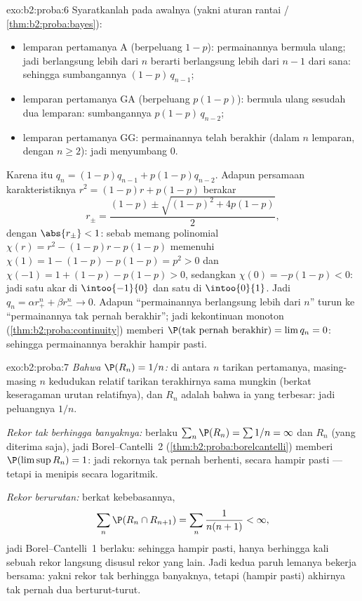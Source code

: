 \begin{solution}{exo:b2:proba:6}
Syaratkanlah pada awalnya (yakni aturan rantai /
\cref{thm:b2:proba:bayes}):
\begin{itemize}
\item lemparan pertamanya A (berpeluang $1 - p$): permainannya bermula
ulang; jadi berlangsung lebih dari $n$ berarti berlangsung lebih dari $n - 1$ dari
sana: sehingga sumbangannya $(1-p)\,q_{n-1}$;
\item lemparan pertamanya GA (berpeluang $p(1-p)$): bermula ulang sesudah dua
lemparan: sumbangannya $p(1-p)\,q_{n-2}$;
\item lemparan pertamanya GG: permainannya telah berakhir (dalam $n$ lemparan, dengan $n
\geq 2$): jadi menyumbang $0$.
\end{itemize}
Karena itu $q_n = (1-p)q_{n-1} + p(1-p)q_{n-2}$. Adapun persamaan
karakteristiknya $r^2 = (1-p)r + p(1-p)$ berakar
\[
r_\pm = \frac{(1-p) \pm \sqrt{(1-p)^2 + 4p(1-p)}}{2},
\]
dengan $\abs{r_\pm} < 1$: sebab memang polinomial $\chi(r) = r^2 -
(1-p)r - p(1-p)$ memenuhi $\chi(1) = 1 - (1-p) - p(1-p) = p^2 >
0$ dan $\chi(-1) = 1 + (1-p) - p(1-p) > 0$, sedangkan $\chi(0) =
-p(1-p) < 0$: jadi satu akar di $\intoo{-1}{0}$ dan satu di $\intoo{0}{1}$.
Jadi $q_n = \alpha r_+^n + \beta r_-^n \to 0$. Adapun  ``permainannya
berlangsung lebih dari $n$'' turun ke ``permainannya tak pernah berakhir''; jadi kekontinuan
monoton (\cref{thm:b2:proba:continuity}) memberi
$\P(\text{tak pernah berakhir}) = \lim q_n = 0$: sehingga permainannya berakhir hampir
pasti.
\end{solution}

\begin{solution}{exo:b2:proba:7}
\emph{Bahwa $\P(R_n) = 1/n$:} di antara $n$ tarikan pertamanya, masing-masing $n$
kedudukan relatif tarikan terakhirnya sama mungkin (berkat keseragaman
urutan relatifnya), dan $R_n$ adalah  bahwa ia yang
terbesar: jadi peluangnya $1/n$.

\emph{Rekor tak berhingga banyaknya:} berlaku $\sum_n \P(R_n) = \sum 1/n =
\infty$ dan $R_n$  (yang diterima saja), jadi
Borel--Cantelli~2 (\cref{thm:b2:proba:borelcantelli}) memberi
$\P(\limsup R_n) = 1$: jadi rekornya tak pernah berhenti, secara hampir pasti --- tetapi
ia menipis secara logaritmik.

\emph{Rekor berurutan:} berkat kebebasannya,
\[
\sum_n \P(R_n \cap R_{n+1})
= \sum_n \frac{1}{n(n+1)} < \infty ,
\]
jadi Borel--Cantelli~1 berlaku: sehingga hampir pasti, hanya berhingga kali
sebuah rekor langsung disusul rekor yang lain. Jadi kedua
paruh lemanya bekerja bersama: yakni rekor tak berhingga banyaknya, tetapi
(hampir pasti) akhirnya tak pernah dua berturut-turut.
\end{solution}

